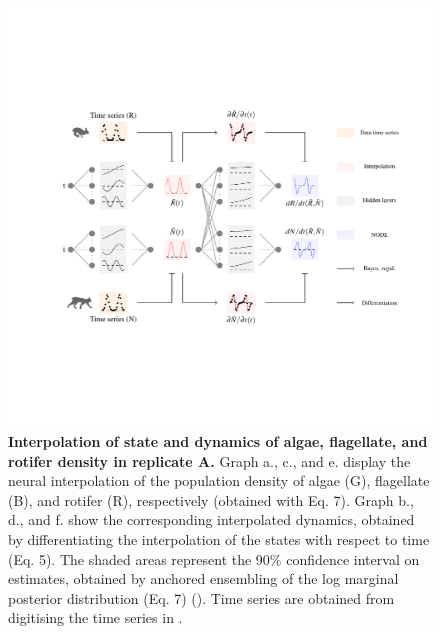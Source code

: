 \documentclass[11pt, oneside]{article}
\begin{document}
\begin{figure}[H]
\includegraphics[width=1\linewidth,page=14]{figures/main.pdf}
\caption{
    \textbf{Interpolation of state and dynamics of algae, flagellate, and rotifer density in replicate A.}
    Graph a., c., and e. display the neural interpolation of the population density of algae (G), flagellate (B), and rotifer (R), respectively (obtained with Eq. 7). 
    Graph b., d., and f. show the corresponding interpolated dynamics, obtained by differentiating the interpolation of the states with respect to time (Eq. 5).
    The shaded areas represent the 90\% confidence interval on estimates, obtained by anchored ensembling of the log marginal posterior distribution (Eq. 7) (\cite{Pearce2018}).
    Time series are obtained from digitising the time series in \cite{Hiltunen2013}.
}
\end{figure}
\newpage
\end{document}
